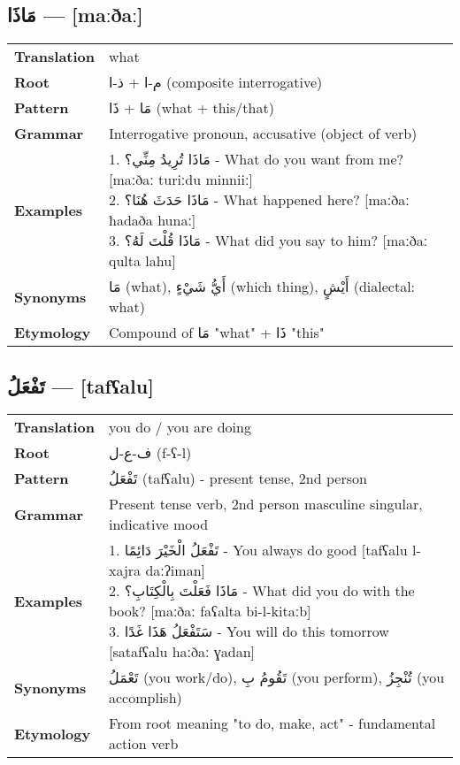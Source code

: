 \documentclass[letterpaper,12pt]{article}
\begin{document}
\subsection{\textarabic{مَاذَا} — [maːðaː]}

\begin{tabular}{p{3cm}p{10cm}}
\toprule
\textbf{Translation} & what \\
\textbf{Root} & \textarabic{م-ا} + \textarabic{ذ-ا} (composite interrogative) \\
\textbf{Pattern} & \textarabic{مَا} + \textarabic{ذَا} (what + this/that) \\
\textbf{Grammar} & Interrogative pronoun, accusative (object of verb) \\
\textbf{Examples} & \makecell[l]{\parbox{9.5cm}{
1. \textarabic{مَاذَا تُرِيدُ مِنِّي؟} - What do you want from me? [maːðaː turiːdu minniiː]\\
2. \textarabic{مَاذَا حَدَثَ هُنَا؟} - What happened here? [maːðaː ħadaða hunaː]\\
3. \textarabic{مَاذَا قُلْتَ لَهُ؟} - What did you say to him? [maːðaː qulta lahu]
}} \\
\midrule
\textbf{Synonyms} & \textarabic{مَا} (what), \textarabic{أَيُّ شَيْءٍ} (which thing), \textarabic{أَيْشٍ} (dialectal: what) \\
\textbf{Etymology} & Compound of \textarabic{مَا} "what" + \textarabic{ذَا} "this" \\
\bottomrule
\end{tabular}

\subsection{\textarabic{تَفْعَلُ} — [tafʕalu]}

\begin{tabular}{p{3cm}p{10cm}}
\toprule
\textbf{Translation} & you do / you are doing \\
\textbf{Root} & \textarabic{ف-ع-ل} (f-ʕ-l) \\
\textbf{Pattern} & \textarabic{تَفْعَلُ} (tafʕalu) - present tense, 2nd person \\
\textbf{Grammar} & Present tense verb, 2nd person masculine singular, indicative mood \\
\textbf{Examples} & \makecell[l]{\parbox{9.5cm}{
1. \textarabic{تَفْعَلُ الْخَيْرَ دَائِمًا} - You always do good [tafʕalu l-xajra daːʔiman]\\
2. \textarabic{مَاذَا فَعَلْتَ بِالْكِتَابِ؟} - What did you do with the book? [maːðaː faʕalta bi-l-kitaːb]\\
3. \textarabic{سَتَفْعَلُ هَذَا غَدًا} - You will do this tomorrow [satafʕalu haːðaː ɣadan]
}} \\
\midrule
\textbf{Synonyms} & \textarabic{تَعْمَلُ} (you work/do), \textarabic{تَقُومُ بِ} (you perform), \textarabic{تُنْجِزُ} (you accomplish) \\
\textbf{Etymology} & From root meaning "to do, make, act" - fundamental action verb \\
\bottomrule
\end{tabular}
\end{document}
